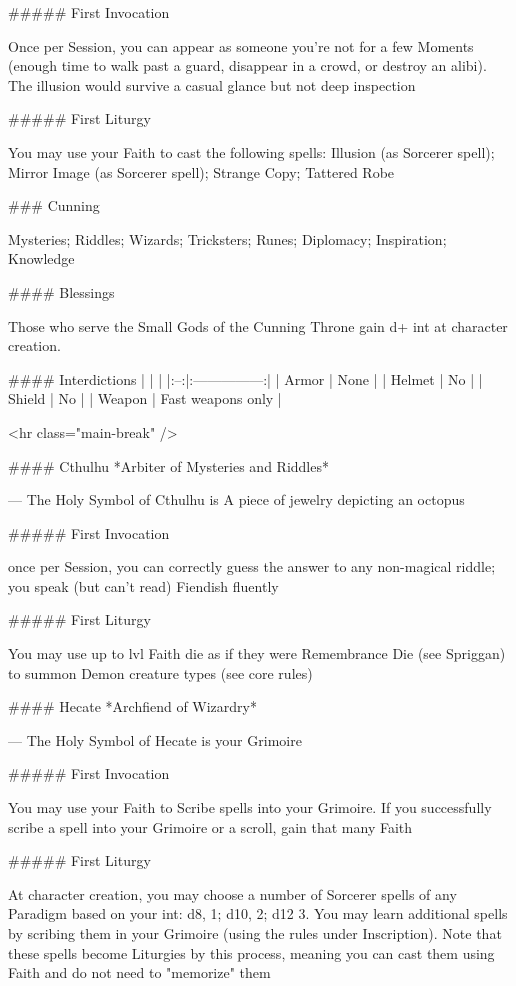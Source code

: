 ##### First Invocation

Once per Session, you can appear as someone you're not for a few Moments (enough time to walk past a guard, disappear in a crowd, or destroy an alibi).  The illusion would survive a casual glance but not deep inspection

##### First Liturgy

You may use your Faith to cast the following spells: Illusion (as Sorcerer spell); Mirror Image (as Sorcerer spell); Strange Copy; Tattered Robe



### Cunning



Mysteries; Riddles; Wizards; Tricksters; Runes; Diplomacy; Inspiration; Knowledge



#### Blessings

Those who serve the Small Gods of the Cunning Throne gain {d+} {int} at character creation.

#### Interdictions
| | |
|:--:|:---------------:|
| Armor | None |
| Helmet | No |
| Shield | No |
| Weapon | Fast weapons only |

<hr class="main-break" />



#### Cthulhu
*Arbiter of Mysteries and Riddles*

---
The Holy Symbol of Cthulhu is A piece of jewelry depicting an octopus

##### First Invocation

once per Session, you can correctly guess the answer to any non-magical riddle; you speak (but can't read) Fiendish fluently

##### First Liturgy

You may use up to {lvl} Faith die as if they were Remembrance Die (see Spriggan) to summon Demon creature types (see core rules)




#### Hecate
*Archfiend of Wizardry*

---
The Holy Symbol of Hecate is your Grimoire

##### First Invocation

You may use your Faith to Scribe spells into your Grimoire. If you successfully scribe a spell into your Grimoire or a scroll, gain that many Faith

##### First Liturgy

At character creation, you may choose a number of Sorcerer spells of any Paradigm based on your {int}:  d8, 1; d10, 2; d12 3.  You may learn additional spells by scribing them in your Grimoire (using the rules under Inscription).  Note that these spells become Liturgies by this process, meaning you can cast them using Faith and do not need to "memorize" them




